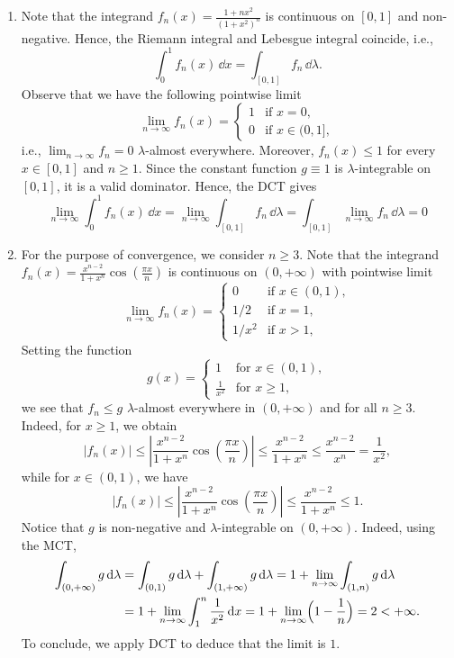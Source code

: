 \begin{enumerate}[label={(\alph*)}]
	\item Note that the integrand $f_n(x)=\frac{1+n x^2}{(1+x^2)^n}$ is continuous on $[0, 1]$ and non-negative. Hence, the Riemann integral and Lebesgue integral coincide, i.e.,
	\[
		\int_0^1 f_n(x)\,\dd x = \int_{[0,1]} f_n\,\dd\lambda.
	\] 
	Observe that we have the following pointwise limit
	\[
		\lim_{n\to\infty} f_n(x) = \begin{cases}
			1 &\text{if  $x=0$}, \\
			0 &\text{if $x\in (0,1]$},
		\end{cases}
	\]
	i.e., $\lim_{n\to\infty} f_n = 0$ $\lambda$-almost everywhere. Moreover, $f_n(x) \le 1$ for every $x\in[0,1]$ and $n\ge 1$. Since the constant function $g\equiv 1$ is $\lambda$-integrable on $[0,1]$, it is a valid dominator. Hence, the DCT gives
	\[
		\lim_{n\to\infty} \int_0^1 f_n(x)\,\dd x = \lim_{n\to\infty} \int_{[0,1]} f_n\,\dd \lambda = \int_{[0,1]} \lim_{n\to\infty} f_n\,\dd\lambda = 0
	\]
	
	\item For the purpose of convergence, we consider $n\ge 3$. Note that the integrand $f_n(x)=\frac{x^{n-2}}{1+x^n}\cos\left(\frac{\pi x}{n}\right)$ is continuous on $(0, +\infty)$ with pointwise limit
	\[
		\lim_{n\to\infty} f_n(x) = \begin{cases}
			0 & \text{if $x\in(0,1)$}, \\
			1/2 & \text{if $x=1$}, \\
			1/x^2 & \text{if $x>1$},
		\end{cases}
	\]
	Setting the function
	\[
		g(x) = \begin{cases}
			1 &\text{for $x\in(0,1)$},\\
			\frac{1}{x^2} &\text{for $x\ge 1$},
		\end{cases}
	\]
	we see that $f_n\le g$ $\lambda$-almost everywhere in $(0,+\infty)$ and for all $n\ge 3$. Indeed, for $x\ge 1$, we obtain
	\[
		|f_n(x)| \le \left| \frac{x^{n-2}}{1+x^n}\cos\left(\frac{\pi x}{n}\right)\right| \le \frac{x^{n-2}}{1+x^n} \le \frac{x^{n-2}}{x^n} =\frac{1}{x^2},
	\]
	while for $x\in(0,1)$, we have
	\[
		|f_n(x)| \le \left| \frac{x^{n-2}}{1+x^n}\cos\left(\frac{\pi x}{n}\right)\right| \le \frac{x^{n-2}}{1+x^n} \le 1.
	\]
	Notice that $g$ is non-negative and $\lambda$-integrable on $(0,+\infty)$. Indeed, using the MCT,
	\begin{align*}
		\int_{(0,+\infty)} g\,\mathrm{d}\lambda &= \int_{(0,1)} g\,\mathrm{d}\lambda + \int_{(1,+\infty)} g\,\mathrm{d}\lambda = 1 + \lim_{n\to\infty} \int_{(1,n)} g\,\mathrm{d}\lambda \\
		&= 1 + \lim_{n\to\infty} \int_1^n \frac{1}{x^2}\,\mathrm{d} x = 1 + \lim_{n\to\infty} \Bigl(1-\frac{1}{n} \Bigr) = 2 < +\infty.
	\end{align*}
	To conclude, we apply DCT to deduce that the limit is $1$.
\end{enumerate}



